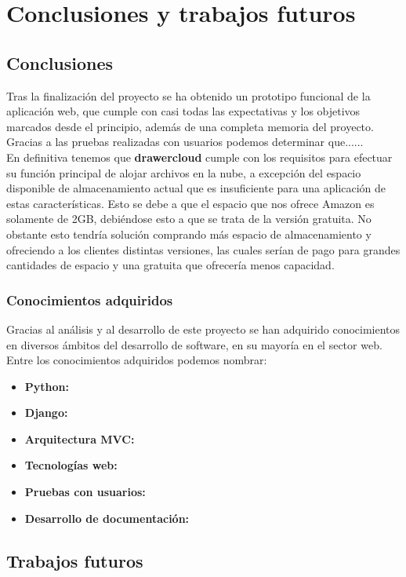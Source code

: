 \chapter{Conclusiones y trabajos futuros}

\section{Conclusiones}
Tras la finalización del proyecto se ha obtenido un prototipo funcional de la aplicación web, que cumple con casi todas las expectativas y los objetivos marcados desde el principio, además de una completa memoria del proyecto. \\
 
Gracias a las pruebas realizadas con usuarios podemos determinar que...... \\

En definitiva tenemos que \textbf{drawercloud} cumple con los requisitos para efectuar su función principal de alojar archivos en la nube, a excepción del espacio disponible de almacenamiento actual que es insuficiente para una aplicación de estas características. Esto se debe a que el espacio que nos ofrece Amazon es solamente de 2GB, debiéndose esto a que se trata de la versión gratuita. No obstante esto tendría solución comprando más espacio de almacenamiento y ofreciendo a los clientes distintas versiones, las cuales serían de pago para grandes cantidades de espacio y una gratuita que ofrecería menos capacidad. \\

\subsection{Conocimientos adquiridos}
Gracias al análisis y al desarrollo de este proyecto se han adquirido conocimientos en diversos ámbitos del desarrollo de software, en su mayoría en el sector web. Entre los conocimientos adquiridos podemos nombrar: 

\begin{itemize}
	\item \textbf{Python:}
	\item \textbf{Django:}
	\item \textbf{Arquitectura MVC:}
	\item \textbf{Tecnologías web:}
	\item \textbf{Pruebas con usuarios:}
	\item \textbf{Desarrollo de documentación:}
\end{itemize}

\section{Trabajos futuros}